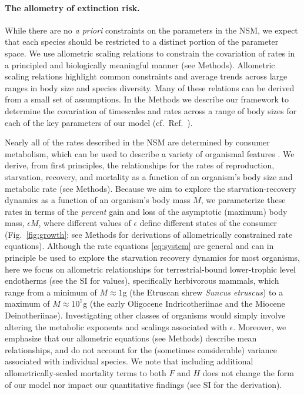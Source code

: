 \documentclass[twocolumn,preprintnumbers,amsmath,amssymb,superscriptaddress]{revtex4}
\begin{document}
\noindent \paragraph*{{\bf The allometry of extinction risk.}} While there
are no {\it a priori} constraints on the parameters in the NSM, we expect
that each species should be restricted to a distinct portion of the parameter
space.  We use allometric scaling relations to constrain the covariation of
rates in a principled and biologically meaningful manner (see Methods).
Allometric scaling relations highlight common constraints and average trends
across large ranges in body size and species diversity. Many of these
relations can be derived from a small set of assumptions.  In the Methods we
describe our framework to determine the covariation of timescales and rates
across a range of body sizes for each of the key parameters of our model
(cf.\ Ref.~\citep{Yodzis:1992hg}).

Nearly all of the rates described in the NSM are determined by consumer
metabolism, which can be used to describe a variety of organismal features
\citep{Brown:2004wq}.  We derive, from first principles, the relationships
for the rates of reproduction, starvation, recovery, and mortality as a
function of an organism's body size and metabolic rate (see Methods).
Because we aim to explore the starvation-recovery dynamics as a function of
an organism's body mass $M$, we parameterize these rates in terms of the
\emph{percent} gain and loss of the asymptotic (maximum) body mass,
$\epsilon M$, where different values of $\epsilon$ define different states of
the consumer (Fig.~\ref{fig:growth}; see Methods for derivations of
allometrically constrained rate equations).  Although the rate equations
\eqref{eq:system} are general and can in principle be used to explore the
starvation recovery dynamics for most organisms, here we focus on allometric
relationships for terrestrial-bound lower-trophic level endotherms (see the
SI for values), specifically herbivorous mammals, which range from a minimum
of $M\approx1$g (the Etruscan shrew \emph{Suncus etruscus}) to a maximum of
$M\approx10^7$g (the early Oligocene Indricotheriinae and the Miocene
Deinotheriinae).  Investigating other classes of organisms would simply
involve altering the metabolic exponents and scalings associated with
$\epsilon$. Moreover, we emphasize that our allometric equations (see
Methods) describe mean relationships, and do not account for the (sometimes
considerable) variance associated with individual species.  We note that
including additional allometrically-scaled mortality terms to both $F$ and
$H$ does not change the form of our model nor impact our quantitative findings
(see SI for the derivation).
\end{document}
